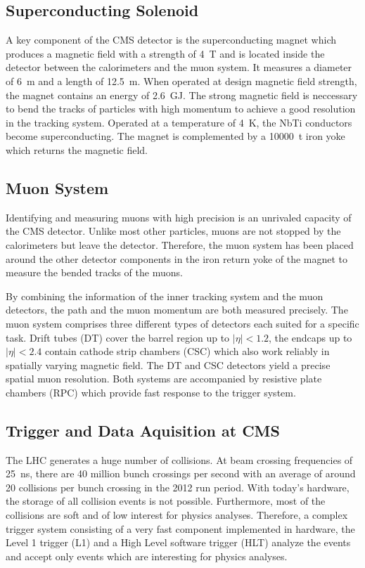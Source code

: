 \subsection{Superconducting Solenoid}

A key component of the CMS detector is the superconducting magnet which
produces a magnetic field with a strength of \SI{4}{\tesla} and is located
inside the detector between the calorimeters and the muon system. It measures a
diameter of \SI{6}{\meter} and a length of \SI{12.5}{\meter}. When operated at
design magnetic field strength, the magnet contains an energy of
\SI{2.6}{\giga\joule}. The strong magnetic field is neccessary to bend the
tracks of particles with high momentum to achieve a good resolution in the
tracking system. Operated at a temperature of \SI{4}{\kelvin}, the NbTi conductors become
superconducting. The magnet is complemented by a \SI{10000}{\tonne} iron yoke
which returns the magnetic field.

\subsection{Muon System}

Identifying and measuring muons with high precision is an unrivaled capacity of
the CMS detector. Unlike most other particles, muons are not stopped by the
calorimeters but leave the detector. Therefore, the muon system has been placed
around the other detector components in the iron return yoke of the magnet to
measure the bended tracks of the muons.

By combining the information of the inner tracking system and the muon
detectors, the path and the muon momentum are both measured precisely. The muon
system comprises three different types of detectors each suited for a specific
task. Drift tubes (DT) cover the barrel region up to $|\eta| < 1.2$, the endcaps
up to $|\eta| < 2.4$ contain cathode strip chambers (CSC) which also
work reliably in spatially varying magnetic field. The DT and CSC detectors
yield a precise spatial muon resolution. Both systems are accompanied by
resistive plate chambers (RPC) which provide fast response to the trigger
system.

\subsection{Trigger and Data Aquisition at CMS}

The LHC generates a huge number of collisions. At beam crossing frequencies of
\SI{25}{\nano \second}, there are 40 million bunch crossings per second with an
average of around 20 collisions per bunch crossing in the 2012 run period. With
today's hardware, the storage of all collision events is not possible.
Furthermore, most of the collisions are soft and of low interest for physics
analyses. Therefore, a complex trigger system consisting of a very fast
component implemented in hardware, the Level 1 trigger (L1) and a High Level
software trigger (HLT) analyze the events and accept only events which are
interesting for physics analyses.

